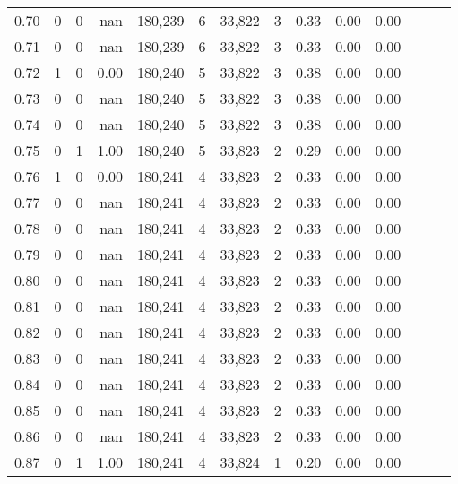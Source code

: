 \begin{tabular}{rrrrrrrrrrrrrr}
0.70 &       0 &      0 &   nan &  180,239 &        6 &  33,822 &       3 &  0.33 &  0.00 &      0.00 \\
0.71 &       0 &      0 &   nan &  180,239 &        6 &  33,822 &       3 &  0.33 &  0.00 &      0.00 \\
0.72 &       1 &      0 &  0.00 &  180,240 &        5 &  33,822 &       3 &  0.38 &  0.00 &      0.00 \\
0.73 &       0 &      0 &   nan &  180,240 &        5 &  33,822 &       3 &  0.38 &  0.00 &      0.00 \\
0.74 &       0 &      0 &   nan &  180,240 &        5 &  33,822 &       3 &  0.38 &  0.00 &      0.00 \\
0.75 &       0 &      1 &  1.00 &  180,240 &        5 &  33,823 &       2 &  0.29 &  0.00 &      0.00 \\
0.76 &       1 &      0 &  0.00 &  180,241 &        4 &  33,823 &       2 &  0.33 &  0.00 &      0.00 \\
0.77 &       0 &      0 &   nan &  180,241 &        4 &  33,823 &       2 &  0.33 &  0.00 &      0.00 \\
0.78 &       0 &      0 &   nan &  180,241 &        4 &  33,823 &       2 &  0.33 &  0.00 &      0.00 \\
0.79 &       0 &      0 &   nan &  180,241 &        4 &  33,823 &       2 &  0.33 &  0.00 &      0.00 \\
0.80 &       0 &      0 &   nan &  180,241 &        4 &  33,823 &       2 &  0.33 &  0.00 &      0.00 \\
0.81 &       0 &      0 &   nan &  180,241 &        4 &  33,823 &       2 &  0.33 &  0.00 &      0.00 \\
0.82 &       0 &      0 &   nan &  180,241 &        4 &  33,823 &       2 &  0.33 &  0.00 &      0.00 \\
0.83 &       0 &      0 &   nan &  180,241 &        4 &  33,823 &       2 &  0.33 &  0.00 &      0.00 \\
0.84 &       0 &      0 &   nan &  180,241 &        4 &  33,823 &       2 &  0.33 &  0.00 &      0.00 \\
0.85 &       0 &      0 &   nan &  180,241 &        4 &  33,823 &       2 &  0.33 &  0.00 &      0.00 \\
0.86 &       0 &      0 &   nan &  180,241 &        4 &  33,823 &       2 &  0.33 &  0.00 &      0.00 \\
0.87 &       0 &      1 &  1.00 &  180,241 &        4 &  33,824 &       1 &  0.20 &  0.00 &      0.00 \\

\end{tabular}
